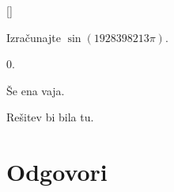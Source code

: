 [\datotekaOdgovori]

%

\begin{vaja}
  Izračunajte $\sin(1928398213 \pi)$.

  \begin{odgovor}
    $0$.
  \end{odgovor}
\end{vaja}

\begin{vaja}
  Še ena vaja.

  \begin{odgovor}
    Rešitev bi bila tu.
  \end{odgovor}
\end{vaja}




\section{Odgovori}
\label{sec:sincos-odgovori}




